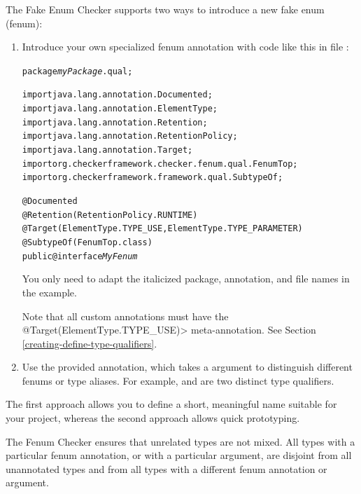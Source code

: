 
The Fake Enum Checker supports two ways to introduce a new fake enum (fenum):

\begin{enumerate}
\item Introduce your own specialized fenum annotation with code like this in
file :

\begin{alltt}
package \textit{myPackage}.qual;

import java.lang.annotation.Documented;
import java.lang.annotation.ElementType;
import java.lang.annotation.Retention;
import java.lang.annotation.RetentionPolicy;
import java.lang.annotation.Target;
import org.checkerframework.checker.fenum.qual.FenumTop;
import org.checkerframework.framework.qual.SubtypeOf;

@Documented
@Retention(RetentionPolicy.RUNTIME)
@Target(\ttlcb{}ElementType.TYPE_USE, ElementType.TYPE_PARAMETER\ttrcb)
@SubtypeOf(FenumTop.class)
public @interface \textit{MyFenum} \ttlcb\ttrcb
\end{alltt}

You only need to adapt the italicized package, annotation, and file names in the example.

Note that all custom annotations must have the
\<@Target(\ttlcb ElementType.TYPE\_USE\ttrcb)> meta-annotation. See Section
\ref{creating-define-type-qualifiers}.

\item Use the provided  annotation, which takes a
 argument to distinguish different fenums or type aliases.
For example,  and  are two distinct
type qualifiers.
\end{enumerate}


The first approach allows you to define a short, meaningful name suitable for
your project, whereas the second approach allows quick prototyping.




The Fenum Checker ensures that unrelated types are not mixed.
All types with a particular fenum annotation, or  with a
particular  argument, are
disjoint from all unannotated types and from all types with a different fenum
annotation or  argument.

